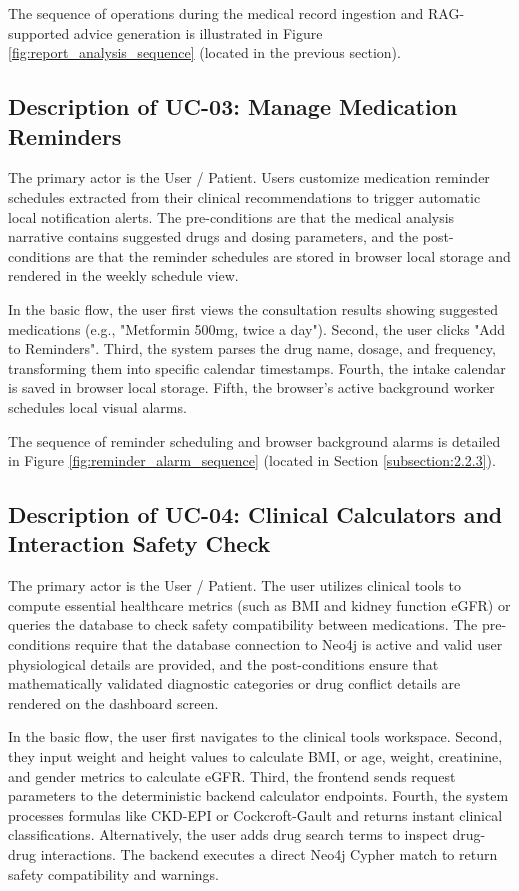 \documentclass[../main.tex]{subfiles}
\begin{document}
The sequence of operations during the medical record ingestion and RAG-supported advice generation is illustrated in Figure \ref{fig:report_analysis_sequence} (located in the previous section).

\subsection{Description of UC-03: Manage Medication Reminders}
The primary actor is the User / Patient. Users customize medication reminder schedules extracted from their clinical recommendations to trigger automatic local notification alerts. The pre-conditions are that the medical analysis narrative contains suggested drugs and dosing parameters, and the post-conditions are that the reminder schedules are stored in browser local storage and rendered in the weekly schedule view.

In the basic flow, the user first views the consultation results showing suggested medications (e.g., "Metformin 500mg, twice a day"). Second, the user clicks "Add to Reminders". Third, the system parses the drug name, dosage, and frequency, transforming them into specific calendar timestamps. Fourth, the intake calendar is saved in browser local storage. Fifth, the browser's active background worker schedules local visual alarms.

The sequence of reminder scheduling and browser background alarms is detailed in Figure \ref{fig:reminder_alarm_sequence} (located in Section \ref{subsection:2.2.3}).

\subsection{Description of UC-04: Clinical Calculators and Interaction Safety Check}
The primary actor is the User / Patient. The user utilizes clinical tools to compute essential healthcare metrics (such as BMI and kidney function eGFR) or queries the database to check safety compatibility between medications. The pre-conditions require that the database connection to Neo4j is active and valid user physiological details are provided, and the post-conditions ensure that mathematically validated diagnostic categories or drug conflict details are rendered on the dashboard screen.

In the basic flow, the user first navigates to the clinical tools workspace. Second, they input weight and height values to calculate BMI, or age, weight, creatinine, and gender metrics to calculate eGFR. Third, the frontend sends request parameters to the deterministic backend calculator endpoints. Fourth, the system processes formulas like CKD-EPI or Cockcroft-Gault and returns instant clinical classifications. Alternatively, the user adds drug search terms to inspect drug-drug interactions. The backend executes a direct Neo4j Cypher match to return safety compatibility and warnings.
\end{document}
